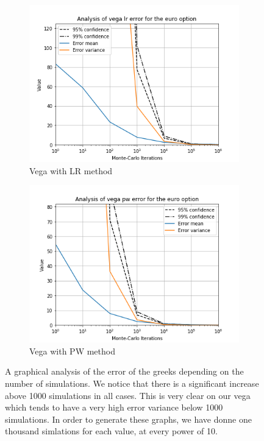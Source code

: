 \documentclass[11pt,a4paper,fleqn,draft]{article}
\begin{document}
\begin{figure}
      \begin{subfigure}[b]{0.45\textwidth}
          \includegraphics[width=\textwidth]{graphs/eurovegalr.png}
          \caption{Vega with LR method}
      \end{subfigure}
      \begin{subfigure}[b]{0.45\textwidth}
          \includegraphics[width=\textwidth]{graphs/eurovegapw.png}
          \caption{Vega with PW method}
      \end{subfigure}

      \caption{\label{fig:eurographs}A graphical analysis of the error of the greeks depending on the number of simulations. We notice that there is a significant increase above 1000 simulations in all cases. This is very clear on our vega which tends to have a very high error variance below 1000 simulations. In order to generate these graphs, we have donne one thousand simlations for each value, at every power of 10.}
\end{figure}
\end{document}
